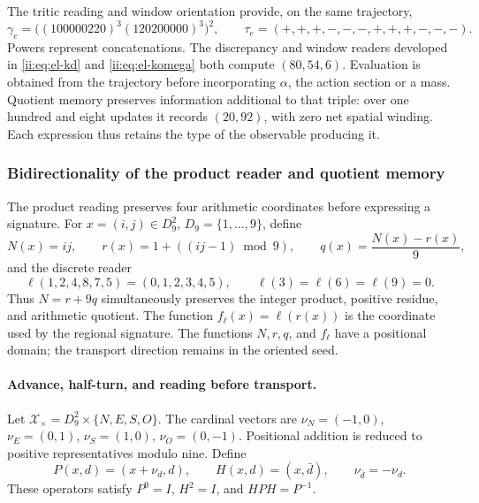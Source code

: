 The tritic reading and window orientation provide, on
the same trajectory,
\[
 \gamma_e=\bigl((100000220)^3(120200000)^3\bigr)^2,\qquad
 \tau_e=(+,+,+,-,-,-,+,+,+,-,-,-).
\]
Powers represent concatenations. The discrepancy and window readers developed in \eqref{ii:eq:el-kd} and \eqref{ii:eq:el-komega} both compute \((80,54,6)\). Evaluation is obtained from the trajectory before incorporating \(\alpha\), the action section or a mass. Quotient memory preserves information additional to that triple: over one hundred and eight updates it records \((20,92)\), with zero net spatial winding. Each expression thus retains the type of the observable producing it.




\subsubsection{Bidirectionality of the product reader and quotient memory}
\label{ii:bim09:seccion}

The product reading preserves four arithmetic coordinates before expressing a signature. For $x=(i,j)\in D_9^2$, $D_9=\{1,\ldots,9\}$, define
\[
 N(x)=ij,\qquad r(x)=1+((ij-1)\bmod9),\qquad
 q(x)=\frac{N(x)-r(x)}9,
\]
and the discrete reader
\[
 \ell(1,2,4,8,7,5)=(0,1,2,3,4,5),\qquad
 \ell(3)=\ell(6)=\ell(9)=0.
\]
Thus $N=r+9q$ simultaneously preserves the integer product, positive residue,
and arithmetic quotient. The function $f_\ell(x)=\ell(r(x))$ is the
coordinate used by the regional signature. The functions $N,r,q$, and
$f_\ell$ have a positional domain; the transport direction remains
in the oriented seed.

\paragraph{Advance, half-turn, and reading before transport.}

Let $\mathscr X_\times=D_9^2\times\{N,E,S,O\}$. The cardinal vectors
are $\nu_N=(-1,0)$, $\nu_E=(0,1)$, $\nu_S=(1,0)$,
$\nu_O=(0,-1)$. Positional addition is reduced to positive representatives
modulo nine. Define
\[
 P(x,d)=(x+\nu_d,d),\qquad H(x,d)=(x,\bar d),
 \qquad \nu_{\bar d}=-\nu_d.
\]
These operators satisfy $P^9=I$, $H^2=I$, and $HPH=P^{-1}$.

